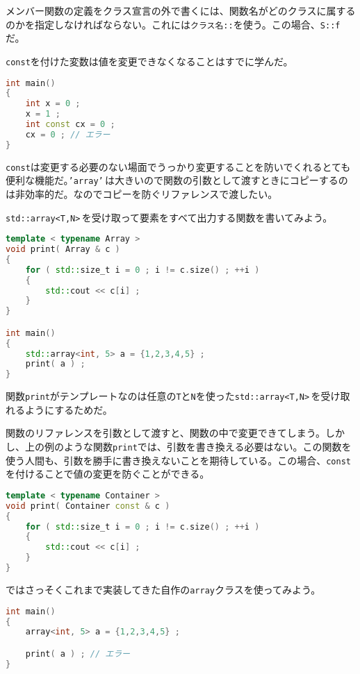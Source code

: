 メンバー関数の定義をクラス宣言の外で書くには、関数名がどのクラスに属するのかを指定しなければならない。これには\texttt{クラス名::}を使う。この場合、\texttt{S::f}だ。


\texttt{const}を付けた変数は値を変更できなくなることはすでに学んだ。

\begin{lstlisting}[language={C++}]
int main()
{
    int x = 0 ;
    x = 1 ;
    int const cx = 0 ;
    cx = 0 ; // エラー
}
\end{lstlisting}

\texttt{const}は変更する必要のない場面でうっかり変更することを防いでくれるとても便利な機能だ。\texttt{'array'}\,は大きいので関数の引数として渡すときにコピーするのは非効率的だ。なのでコピーを防ぐリファレンスで渡したい。

\texttt{std::array<T,N>}\,を受け取って要素をすべて出力する関数を書いてみよう。

\begin{lstlisting}[language={C++}]
template < typename Array >
void print( Array & c )
{
    for ( std::size_t i = 0 ; i != c.size() ; ++i )
    {
        std::cout << c[i] ;
    }
}

int main()
{
    std::array<int, 5> a = {1,2,3,4,5} ;
    print( a ) ;
}
\end{lstlisting}

関数\texttt{print}がテンプレートなのは任意の\texttt{T}と\texttt{N}を使った\texttt{std::array<T,N>}\,を受け取れるようにするためだ。

関数のリファレンスを引数として渡すと、関数の中で変更できてしまう。しかし、上の例のような関数\texttt{print}では、引数を書き換える必要はない。この関数を使う人間も、引数を勝手に書き換えないことを期待している。この場合、\texttt{const}を付けることで値の変更を防ぐことができる。

\begin{lstlisting}[language={C++}]
template < typename Container >
void print( Container const & c )
{
    for ( std::size_t i = 0 ; i != c.size() ; ++i )
    {
        std::cout << c[i] ;
    }
}
\end{lstlisting}

ではさっそくこれまで実装してきた自作の\texttt{array}クラスを使ってみよう。

\begin{lstlisting}[language={C++}]
int main()
{
    array<int, 5> a = {1,2,3,4,5} ;

    print( a ) ; // エラー
}
\end{lstlisting}

